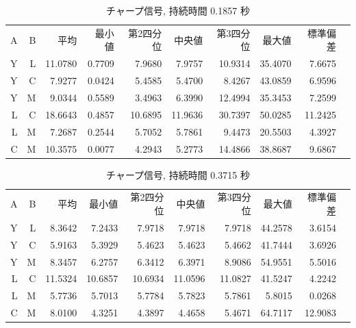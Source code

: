 \begin{table}[p]\centering
  \caption{チャープ信号, 持続時間 0.1857 秒} %
  \label{tab:hikaku5}
  \begin{tabular}{rrrrrrrrrr}
    \hline
     A & B & 平均 & 最小値 & 第2四分位 & 中央値 & 第3四分位 & 最大値 & 標準偏差 \\
     Y & L & 11.0780 & 0.7709 & 7.9680 & 7.9757 & 10.9314 & 35.4070 & 7.6675 \\
     Y & C & 7.9277 & 0.0424 & 5.4585 & 5.4700 & 8.4267 & 43.0859 & 6.9596 \\
     Y & M & 9.0344 & 0.5589 & 3.4963 & 6.3990 & 12.4994 & 35.3453 & 7.2599 \\
     L & C & 18.6643 & 0.4857 & 10.6895 & 11.9636 & 30.7397 & 50.0285 & 11.2425 \\
     L & M & 7.2687 & 0.2544 & 5.7052 & 5.7861 & 9.4473 & 20.5503 & 4.3927 \\
     C & M & 10.3575 & 0.0077 & 4.2943 & 5.2773 & 14.4866 & 38.8687 & 9.6867 \\
    \hline
  \end{tabular}
\end{table}

\begin{table}[p]\centering
  \caption{チャープ信号, 持続時間 0.3715 秒} %
  \label{tab:hikaku6}
  \begin{tabular}{rrrrrrrrrr}
    \hline
     A & B & 平均 & 最小値 & 第2四分位 & 中央値 & 第3四分位 & 最大値 & 標準偏差 \\
     Y & L & 8.3642 & 7.2433 & 7.9718 & 7.9718 & 7.9718 & 44.2578 & 3.6154 \\
     Y & C & 5.9163 & 5.3929 & 5.4623 & 5.4623 & 5.4662 & 41.7444 & 3.6926 \\
     Y & M & 8.3457 & 6.2757 & 6.3412 & 6.3971 & 8.9086 & 54.9551 & 5.5016 \\
     L & C & 11.5324 & 10.6857 & 10.6934 & 11.0596 & 11.0827 & 41.5247 & 4.2242 \\
     L & M & 5.7736 & 5.7013 & 5.7784 & 5.7823 & 5.7861 & 5.8015 & 0.0268 \\
     C & M & 8.0100 & 4.3251 & 4.3897 & 4.4658 & 5.4671 & 64.7117 & 12.9083 \\
    \hline
  \end{tabular}
\end{table}

